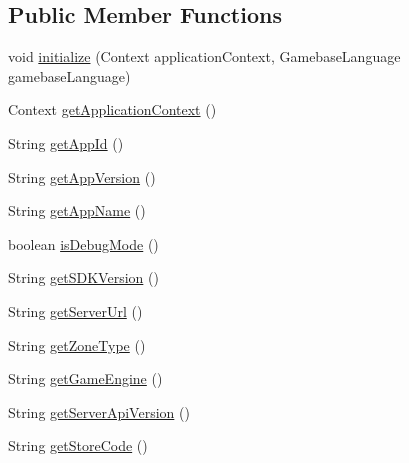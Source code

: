 \subsection*{Public Member Functions}
\begin{DoxyCompactItemize}
\item 
void \hyperlink{classcom_1_1toast_1_1android_1_1gamebase_1_1_gamebase_system_info_ab5f30aa3d7309d505e8a14bbaa788018}{initialize} (Context application\+Context, Gamebase\+Language gamebase\+Language)
\item 
Context \hyperlink{classcom_1_1toast_1_1android_1_1gamebase_1_1_gamebase_system_info_a4193dd4462177faaa3f6277be6688d19}{get\+Application\+Context} ()
\item 
String \hyperlink{classcom_1_1toast_1_1android_1_1gamebase_1_1_gamebase_system_info_a240d4abd81a68efe7d3b9e10537763f5}{get\+App\+Id} ()
\item 
String \hyperlink{classcom_1_1toast_1_1android_1_1gamebase_1_1_gamebase_system_info_a5344eff846b91c2a48847886ee73800f}{get\+App\+Version} ()
\item 
String \hyperlink{classcom_1_1toast_1_1android_1_1gamebase_1_1_gamebase_system_info_a0f6a95988edf68622166f1b0454eb0d3}{get\+App\+Name} ()
\item 
boolean \hyperlink{classcom_1_1toast_1_1android_1_1gamebase_1_1_gamebase_system_info_a2c34cde0254c467f80c68bf5deec40b4}{is\+Debug\+Mode} ()
\item 
String \hyperlink{classcom_1_1toast_1_1android_1_1gamebase_1_1_gamebase_system_info_ac96efced9563117c90895f8296917de5}{get\+S\+D\+K\+Version} ()
\item 
String \hyperlink{classcom_1_1toast_1_1android_1_1gamebase_1_1_gamebase_system_info_ac882f2edcc1d0c1bfb3f6a24c6491a66}{get\+Server\+Url} ()
\item 
String \hyperlink{classcom_1_1toast_1_1android_1_1gamebase_1_1_gamebase_system_info_ae87f638a781db3f92a0bbe89bd3a611f}{get\+Zone\+Type} ()
\item 
String \hyperlink{classcom_1_1toast_1_1android_1_1gamebase_1_1_gamebase_system_info_afd1d110f94cae3a98816c31aca169df1}{get\+Game\+Engine} ()
\item 
String \hyperlink{classcom_1_1toast_1_1android_1_1gamebase_1_1_gamebase_system_info_af74623fc60ebad6b08ba78668d4961cc}{get\+Server\+Api\+Version} ()
\item 
String \hyperlink{classcom_1_1toast_1_1android_1_1gamebase_1_1_gamebase_system_info_ac53dc9a5d7c5e8a4aa816b4476a8c93f}{get\+Store\+Code} ()
\item 

\end{DoxyCompactItemize}
